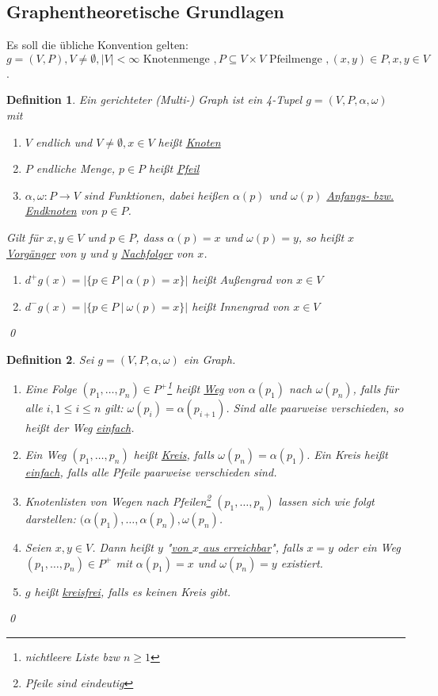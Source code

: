 \documentclass[ngerman]{scrartcl}
\theoremstyle{custom}
\newtheorem{mdef}{Definition} \numberwithin{mdef}{subsection}
\newcommand{\0}{\mathbf{0}}
\newcommand{\1}{\mathbf{L}}
\begin{document}
\subsection{Graphentheoretische Grundlagen}
Es soll die \"ubliche Konvention gelten:
$g=(V,P), V \not = \emptyset, \vert V \vert < \infty \text{ Knotenmenge },
P \subseteq V \times V \text{ Pfeilmenge }, (x,y) \in P, x,y \in V$.

\begin{mdef}
Ein gerichteter (Multi-) Graph ist ein 4-Tupel $g=(V,P,\alpha,
\omega)$ mit 
\begin{enumerate}
\item[(1)] $V$ endlich und $V \not = \emptyset, x \in V$ hei\ss t
  \underline{Knoten}
\item[(2)] $P$ endliche Menge, $p \in P$ hei\ss t \underline{Pfeil}
\item[(3)] $\alpha, \omega: P \rightarrow V$ sind Funktionen, dabei
  hei\ss en $\alpha(p)$ und $\omega(p)$ \underline{Anfangs- bzw. Endknoten} von $p
  \in P$.
\end{enumerate}
Gilt f\"ur $x,y \in V$ und $p \in P$, dass $\alpha(p) = x$ und
$\omega(p)=y$, so hei\ss t $x$ \underline{Vorg\"anger} von $y$ und $y$ \underline{Nachfolger}
von $x$.\\
\begin{enumerate}
\item[(4)] $d^{+}g(x) = \vert \{ p \in P ~\vert~ \alpha(p)=x\}\vert$
  hei\ss t Au\ss engrad von $x \in V$
\item[(5)] $d^{-}g(x) = \vert \{ p \in P ~\vert~ \omega(p)=x\}\vert$
  hei\ss t Innengrad von $x \in V$
\end{enumerate}
\qed
\end{mdef}

\begin{mdef}
Sei $g=(V,P,\alpha, \omega)$ ein Graph.
\begin{enumerate}
\item[(1)] Eine Folge $(p_1,\dots,p_n) \in P^+$\footnote{nichtleere
    Liste bzw $n \geq 1$} hei\ss t \underline{Weg} von $\alpha{(p_1)}$
  nach $\omega(p_n)$, falls f\"ur alle $i, 1 \leq i \leq n$ gilt:
  $\omega(p_i) = \alpha(p_{i+1})$. Sind alle paarweise verschieden, so
  hei\ss t der Weg \underline{einfach}.
\item[(2)] Ein Weg $(p_1, \dots, p_n)$ hei\ss t \underline{Kreis}, falls
  $\omega(p_n) = \alpha(p_1)$. Ein Kreis hei\ss t \underline{einfach},
  falls alle Pfeile paarweise verschieden sind.
\item[(3)] Knotenlisten von Wegen nach Pfeilen\footnote{Pfeile sind
    eindeutig} $(p_1, \dots, p_n)$ lassen sich wie folgt darstellen:
  $(\alpha(p_1),\dots, \alpha(p_n), \omega(p_n)$.
\item[(4)] Seien $x, y \in V$. Dann hei\ss t $y$ "\underline{von $x$
    aus erreichbar}", falls $x=y$ oder ein Weg $(p_1, \dots, p_n) \in
  P^+$ mit $\alpha(p_1) = x$ und $\omega(p_n) = y$ existiert.
\item[(5)] $g$ hei\ss t \underline{kreisfrei}, falls es keinen Kreis
  gibt.
\end{enumerate}
\qed 
\end{mdef}
\end{document}
